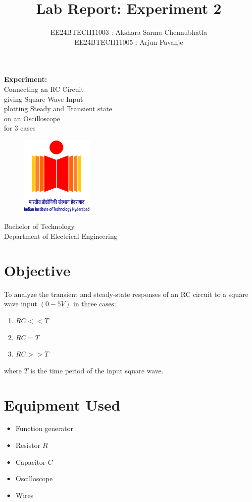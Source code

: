 \documentclass[a4paper,12pt]{article}
\title{\textbf{Lab Report: Experiment 2}}
\author{EE24BTECH11003 : Akshara Sarma Chennubhatla\\EE24BTECH11005 : Arjun Pavanje}
\begin{document}
\maketitle
\begin{center}
	\textbf{Experiment:}\\Connecting an RC Circuit\\giving Square Wave Input\\plotting Steady and Transient state\\on an Oscilloscope\\for $3$ cases
\end{center}
\vspace{30pt}
\begin{figure}[h!]
	\centering
	\includegraphics[width = 100pt]{.logo/logo.png}\\
\end{figure}
\vspace{50pt}
\begin{center}
Bachelor of Technology\\
\vspace{10pt}
Department of Electrical Engineering\\
\end{center}
\newpage
\section*{Objective}

To analyze the transient and steady-state responses of an RC circuit to a square wave input $(0-5V)$ in three cases: \newline
\begin{enumerate}
  \item $RC << T$\\
  \item $RC = T$\\
  \item $RC >> T$
\end{enumerate}
where $T$ is the time period of the input square wave.


\section*{Equipment Used}
\begin{itemize}
  \item Function generator
  \item Resistor \(R\)
  \item Capacitor \(C\)
  \item Oscilloscope
  \item Wires
\end{itemize}
\end{document}
